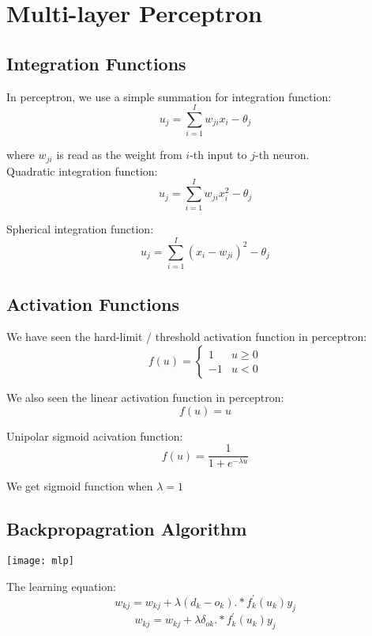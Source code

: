 \chapter{Multi-layer Perceptron}

\begin{multicols*}{2}

\section{Integration Functions}

\noindent In perceptron, we use a simple summation for integration function:
$$u_j = \sum_{i=1}^I w_{ji}x_i - \theta_j$$

\noindent where $w_{ji}$ is read as the weight from $i$-th input to $j$-th neuron. \\

\noindent Quadratic integration function:
$$u_j = \sum_{i=1}^I w_{ji}x_i^2 - \theta_j$$

\noindent Spherical integration function:
$$u_j = \sum_{i=1}^I ( x_i - w_{ji})^2 - \theta_j$$

\section{Activation Functions}

\noindent We have seen the hard-limit / threshold activation function in perceptron:
$$
f(u) = 
\begin{cases}
1 & u \ge 0\\
-1 & u < 0
\end{cases}
$$

\noindent We also seen the linear activation function in perceptron:
$$f(u) = u$$

\noindent Unipolar sigmoid acivation function:
$$f(u) = \frac{1}{1+e^{-\lambda u}}$$

\noindent We get sigmoid function when $\lambda=1$

\section{Backpropagration Algorithm}

\begin{center}
\texttt{[image: mlp]}
\end{center}

\noindent The learning equation:
$$w_{kj} = w_{kj} + \lambda (d_k - o_k) .* f_k^{'}(u_k) y_j$$
$$w_{kj} = w_{kj} + \lambda \delta_{ok} .* f_k^{'}(u_k) y_j$$


\end{multicols*}
